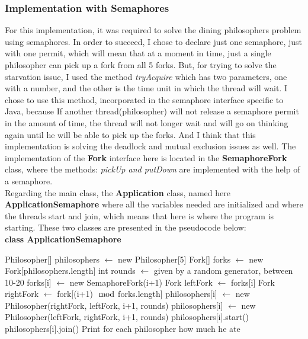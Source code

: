\documentclass[14pt]{article}
\begin{document}
\subsubsection{Implementation with Semaphores}
For this implementation, it was required to solve the dining philosophers problem using semaphores. In order to succeed, I chose to declare just one semaphore, just with one permit, which will mean that at a moment in time, just a single philosopher can pick up a fork from all 5 forks. But, for trying to solve the starvation issue, I used the method \textit{tryAcquire} which has two parameters, one with a number, and the other is the time unit in which the thread will wait. I chose to use this method, incorporated in the semaphore interface specific to Java, because If another thread(philosopher) will not release a semaphore permit in the amount of time, the thread will not longer wait and will go on thinking again until he will be able to pick up the forks. And I think that this implementation is solving the deadlock and mutual exclusion issues as well. The implementation of the \textbf{Fork} interface here is located in the \textbf{SemaphoreFork} class, where the methods: \textit{pickUp and putDown} are implemented with the help of a semaphore. 
\vspace{2.5 mm}
\\Regarding the main class, the \textbf{Application} class, named here \textbf{ApplicationSemaphore} where all the variables needed are initialized and where the threads start and join, which means that here is where the program is starting. These two classes are presented in the pseudocode below:
\vspace{2.5 mm}
\\\textbf{class ApplicationSemaphore}
\begin{algorithmic}
    \State Philosopher[] philosophers $\gets$ new Philosopher[5]
    \State Fork[] forks $\gets$ new Fork[philosophers.length]
    \State int rounds $\gets$ given by a random generator, between 10-20
        \State forks[i] $\gets$ new SemaphoreFork(i+1)
    \EndFor
        \State Fork leftFork $\gets$ forks[i]
        \State Fork rightFork $\gets$ fork[(i+1)$\mod$forks.length]
            \State philosophers[i] $\gets$ new Philosopher(rightFork, leftFork, i+1, rounds)
        \Else
            \State philosophers[i] $\gets$ new Philosopher(leftFork, rightFork, i+1, rounds)
        \EndIf
        \State philosophers[i].start()
    \EndFor
        \State philosophers[i].join()
    \EndFor
    \State Print for each philosopher how much he ate
\EndFunction
\end{algorithmic}
\end{document}
